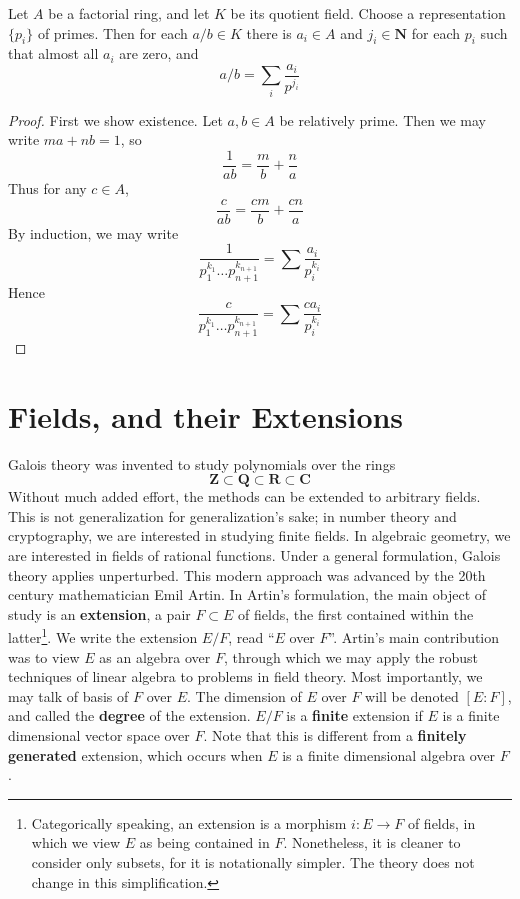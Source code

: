 \begin{theorem}
    Let $A$ be a factorial ring, and let $K$ be its quotient field. Choose a representation $\{ p_i \}$ of primes. Then for each $a/b \in K$ there is $a_i \in A$ and $j_i \in \mathbf{N}$ for each $p_i$ such that almost all $a_i$ are zero, and
    \[ a/b = \sum_i \frac{a_i}{p^{j_i}} \]
\end{theorem}
\begin{proof}
    First we show existence. Let $a,b \in A$ be relatively prime. Then we may write $ma + nb = 1$, so
    \[ \frac{1}{ab} = \frac{m}{b} + \frac{n}{a} \]
    Thus for any $c \in A$,
    \[ \frac{c}{ab} = \frac{cm}{b} + \frac{cn}{a} \]
    By induction, we may write
    \[  \frac{1}{p_1^{k_1} \dots p_{n+1}^{k_{n+1}}} = \sum \frac{a_i}{p_i^{k_i}} \]
    Hence
    \[ \frac{c}{p_1^{k_1} \dots p_{n+1}^{k_{n+1}}} = \sum \frac{c a_i}{p_i^{k_i}} \]
\end{proof}







\chapter{Fields, and their Extensions}

Galois theory was invented to study polynomials over the rings
%
\[ \mathbf{Z} \subset \mathbf{Q} \subset \mathbf{R} \subset \mathbf{C} \]
%
Without much added effort, the methods can be extended to arbitrary fields. This is not generalization for generalization's sake; in number theory and cryptography, we are interested in studying finite fields. In algebraic geometry, we are interested in fields of rational functions. Under a general formulation, Galois theory applies unperturbed. This modern approach was advanced by the 20th century mathematician Emil Artin. In Artin's formulation, the main object of study is an {\bf extension}, a pair $F \subset E$ of fields, the first contained within the latter\footnote{Categorically speaking, an extension is a morphism $i: E \to F$ of fields, in which we view $E$ as being contained in $F$. Nonetheless, it is cleaner to consider only subsets, for it is notationally simpler. The theory does not change in this simplification.}. We write the extension $E/F$, read ``$E$ over $F$''. Artin's main contribution was to view $E$ as an algebra over $F$, through which we may apply the robust techniques of linear algebra to problems in field theory. Most importantly, we may talk of basis of $F$ over $E$. The dimension of $E$ over $F$ will be denoted $[E:F]$, and called the {\bf degree} of the extension. $E/F$ is a {\bf finite} extension if $E$ is a finite dimensional vector space over $F$. Note that this is different from a {\bf finitely generated} extension, which occurs when $E$ is a finite dimensional algebra over $F$.

